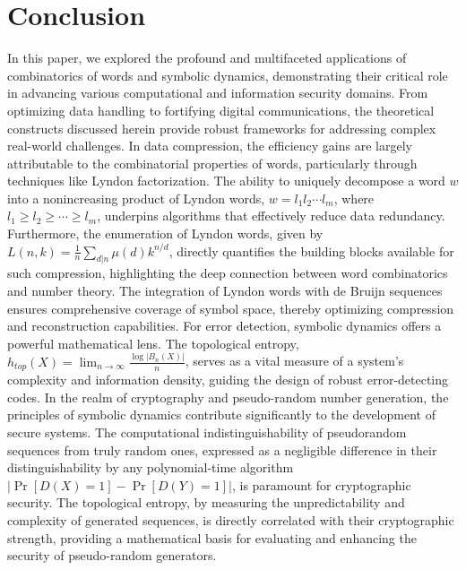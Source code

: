 \documentclass[12pt,a4paper]{article}
\begin{document}
\section{Conclusion}
In this paper, we explored the profound and multifaceted applications of combinatorics of words and symbolic dynamics, demonstrating their critical role in advancing various computational and information security domains. From optimizing data handling to fortifying digital communications, the theoretical constructs discussed herein provide robust frameworks for addressing complex real-world challenges. 
In data compression, the efficiency gains are largely attributable to the combinatorial properties of words, particularly through techniques like Lyndon factorization. The ability to uniquely decompose a word $w$ into a nonincreasing product of Lyndon words, $w = l_1 l_2 \cdots l_m$, where $l_1 \geq l_2 \geq \cdots \geq l_m$, underpins algorithms that effectively reduce data redundancy. Furthermore, the enumeration of Lyndon words, given by $L(n,k) = \frac{1}{n}\sum_{d|n}\mu(d)k^{n/d}$, directly quantifies the building blocks available for such compression, highlighting the deep connection between word combinatorics and number theory. The integration of Lyndon words with de Bruijn sequences ensures comprehensive coverage of symbol space, thereby optimizing compression and reconstruction capabilities. 
For error detection, symbolic dynamics offers a powerful mathematical lens. The topological entropy, $h_{top}(X) = \lim_{n \to \infty} \frac{\log|B_n(X)|}{n}$, serves as a vital measure of a system's complexity and information density, guiding the design of robust error-detecting codes. 
In the realm of cryptography and pseudo-random number generation, the principles of symbolic dynamics contribute significantly to the development of secure systems. The computational indistinguishability of pseudorandom sequences from truly random ones, expressed as a negligible difference in their distinguishability by any polynomial-time algorithm $|\Pr[D(X) = 1] - \Pr[D(Y) = 1]|$, is paramount for cryptographic security. The topological entropy, by measuring the unpredictability and complexity of generated sequences, is directly correlated with their cryptographic strength, providing a mathematical basis for evaluating and enhancing the security of pseudo-random generators. 
\end{document}
